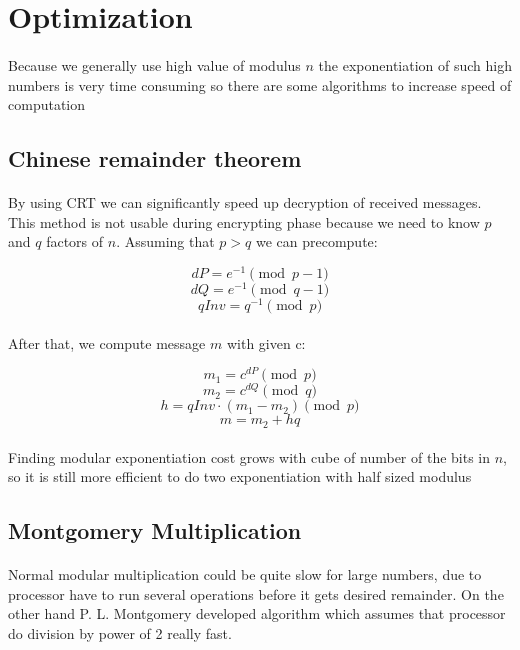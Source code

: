 \documentclass[thesis=B,english]{FITthesis}[2012/10/20]
\begin{document}
{\section{Optimization}
\paragraph*{}
{Because we generally use high value of modulus \(n\) the exponentiation of such high numbers is very time consuming so there are some algorithms to increase speed of computation }

\subsection{Chinese remainder theorem}

\paragraph*{}
{By using CRT we can significantly speed up decryption of received messages. This method is not usable during encrypting phase because we need to know \(p\) and \(q\) factors of \(n\).
Assuming that \(p>q\) we can precompute:}

\[dP = e^{-1} \pmod{p-1}\]
\[dQ = e^{-1} \pmod{q-1}\]
\[qInv = q^{-1} \pmod{p}\]

\paragraph*{}
{After that, we compute message \(m\) with given c:}

\[m_1 = c^{dP} \pmod{p}\]
\[m_2 = c^{dQ} \pmod{q}\]
\[h = qInv \cdot (m_1 - m_2) \pmod{p}\]  
\[m = m_2 + hq\]

\paragraph*{}
{Finding modular exponentiation cost grows with cube of number of the bits in \(n\), so it is still more efficient to do two exponentiation with half sized modulus}



\subsection{Montgomery Multiplication}

\paragraph*{}
{Normal modular multiplication could be quite slow for large numbers, due to processor have to run several operations before it gets desired remainder. 
On the other hand P. L. Montgomery developed algorithm which assumes that processor do division by power of 2 really fast.}
}
\end{document}
